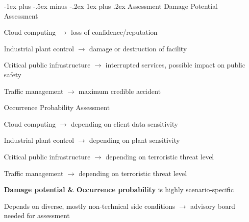 \documentclass[a4paper]{article}
\makeatletter
\renewcommand{\note}[2]{\begin{noteBox} \textbf{#1} #2 \end{noteBox}}
\renewcommand{\subsubsection}{\@startsection{subsubsection}{3}{0mm}%
                                {-1ex plus -.5ex minus -.2ex}%
                                {1ex plus .2ex}%
                                {\normalfont\small\bfseries}}
\makeatother
\begin{document}
\begin{multicols}{3}
    \subsubsection{Assessment}
    Damage Potential Assessment
    \begin{itemize*}
        \item Cloud computing $\rightarrow$ loss of confidence/reputation
        \item Industrial plant control $\rightarrow$  damage or destruction of facility
        \item Critical public infrastructure $\rightarrow$  interrupted services, possible impact on public safety
        \item Traffic management $\rightarrow$ maximum credible accident
    \end{itemize*}
    Occurrence Probability Assessment
    \begin{itemize*}
        \item Cloud computing $\rightarrow$  depending on client data sensitivity
        \item Industrial plant control $\rightarrow$  depending on plant sensitivity
        \item Critical public infrastructure $\rightarrow$  depending on terroristic threat level
        \item Traffic management $\rightarrow$  depending on terroristic threat level
    \end{itemize*}

    \note{Damage potential \& Occurrence probability}{is highly scenario-specific}

    Depends on diverse, mostly non-technical side conditions $\rightarrow$  advisory board needed for assessment


\end{multicols}
\end{document}
